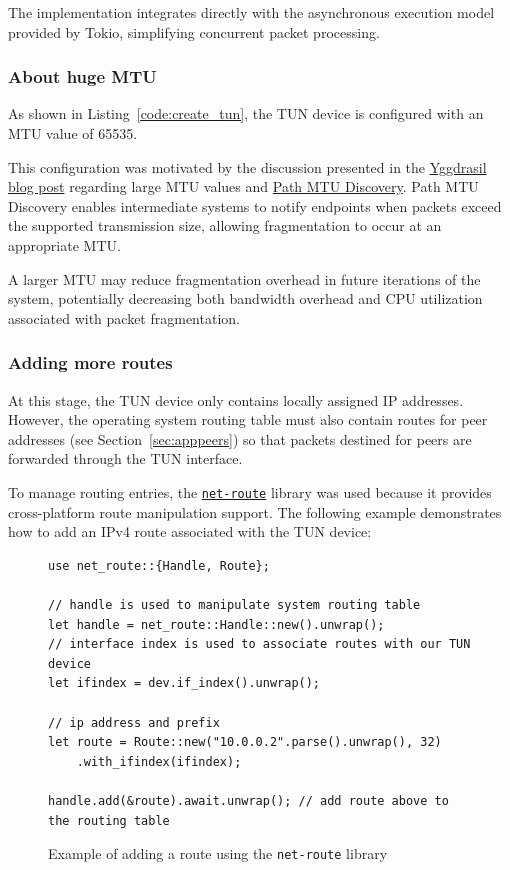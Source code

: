 \documentclass[a4paper, 10pt]{article}
\begin{document}
The implementation integrates directly with the asynchronous execution model provided by Tokio, simplifying concurrent packet processing.

\newpage

\subsubsection{About huge MTU} \label{sec:hugemtu}
As shown in Listing~\ref{code:create_tun}, the TUN device is configured with an MTU value of 65535.

This configuration was motivated by the discussion presented in the
\href{https://yggdrasil-network.github.io/2018/07/13/about-mtu.html}{Yggdrasil blog post}
regarding large MTU values and \href{https://en.wikipedia.org/wiki/Path_MTU_Discovery}{Path MTU Discovery}.
Path MTU Discovery enables intermediate systems to notify endpoints when packets exceed the supported transmission size, allowing fragmentation to occur at an appropriate MTU.

A larger MTU may reduce fragmentation overhead in future iterations of the system, potentially decreasing both bandwidth overhead and CPU utilization associated with packet fragmentation.

\subsubsection{Adding more routes}
At this stage, the TUN device only contains locally assigned IP addresses. However, the operating system routing table must also contain routes for peer addresses
(see Section~\ref{sec:apppeers}) so that packets destined for peers are forwarded through the TUN interface.

To manage routing entries, the \href{https://crates.io/crates/net-route}{\texttt{net-route}} library was used because it provides cross-platform route manipulation support.
The following example demonstrates how to add an IPv4 route associated with the TUN device:
\begin{figure}[H]
  \begin{verbatim}
use net_route::{Handle, Route};

// handle is used to manipulate system routing table
let handle = net_route::Handle::new().unwrap();
// interface index is used to associate routes with our TUN device
let ifindex = dev.if_index().unwrap();

// ip address and prefix
let route = Route::new("10.0.0.2".parse().unwrap(), 32)
    .with_ifindex(ifindex);

handle.add(&route).await.unwrap(); // add route above to the routing table
  \end{verbatim}
  \caption{Example of adding a route using the \texttt{net-route} library}
\end{figure}
\end{document}
